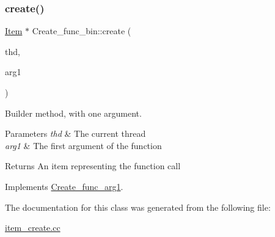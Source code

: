 \subsubsection{\texorpdfstring{create()}{create()}}
{\footnotesize\ttfamily \mbox{\hyperlink{classItem}{Item}} $\ast$ Create\+\_\+func\+\_\+bin\+::create (\begin{DoxyParamCaption}\item[{T\+HD $\ast$}]{thd,  }\item[{\mbox{\hyperlink{classItem}{Item}} $\ast$}]{arg1 }\end{DoxyParamCaption})\hspace{0.3cm}{\ttfamily [virtual]}}

Builder method, with one argument. 
\begin{DoxyParams}{Parameters}
{\em thd} & The current thread \\
\hline
{\em arg1} & The first argument of the function \\
\hline
\end{DoxyParams}
\begin{DoxyReturn}{Returns}
An item representing the function call 
\end{DoxyReturn}


Implements \mbox{\hyperlink{classCreate__func__arg1_a3e9a98f755cd82c3e762e334c955a8c9}{Create\+\_\+func\+\_\+arg1}}.



The documentation for this class was generated from the following file\+:\begin{DoxyCompactItemize}
\item 
\mbox{\hyperlink{item__create_8cc}{item\+\_\+create.\+cc}}\end{DoxyCompactItemize}
